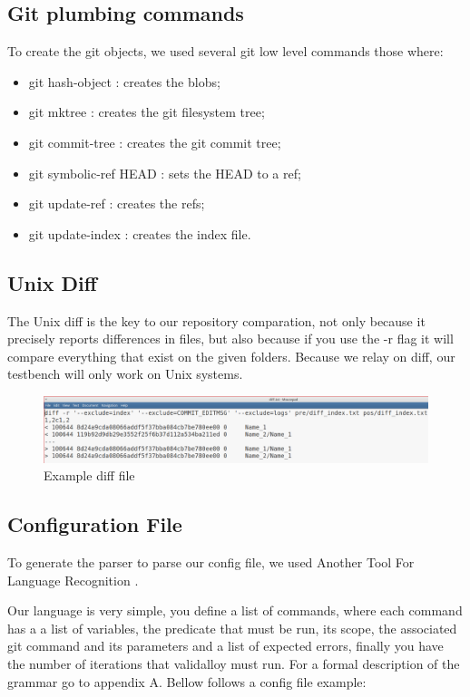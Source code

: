 \subsection{Git plumbing commands}
To create the git objects, we used several git low level\cite{gitpro}\cite{git_man} commands those where:
\begin{itemize}
\item git hash-object : creates the blobs;
\item git mktree : creates the git filesystem tree;
\item git commit-tree : creates the git commit tree;
\item git symbolic-ref HEAD : sets the HEAD to a ref;
\item git update-ref : creates the refs;
\item git update-index : creates the index file.
\end{itemize}
\newpage
\subsection{Unix Diff}
The Unix diff is the key to our repository comparation, not only because it precisely reports differences in files, but also because if you use the -r flag it will compare everything that exist on the given folders.
Because we relay on diff, our testbench will only work on Unix systems.

\begin{figure}[H]
\centering
\includegraphics[width=\textwidth]{images/DIFS.png}
\caption{Example diff file}
\end{figure}

\subsection{Configuration File}

To generate the parser to parse our config file, we used Another Tool For Language Recognition \cite{antlr}. 

Our language is very simple, you define a list of commands, where each command has a a list of variables, the predicate that must be run, its scope, the associated git command and its parameters and a list of expected errors, finally you have the number of iterations that validalloy must run. For a formal description of the grammar go to appendix A. Bellow follows a config file example:


